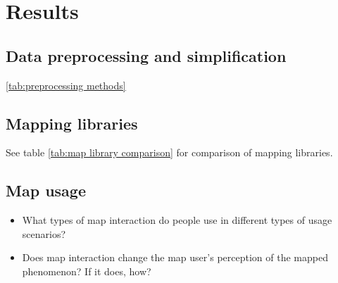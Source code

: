 \section{Results}

\subsection{Data preprocessing and simplification}

\ref{tab:preprocessing methods}



\subsection{Mapping libraries}


See table \ref{tab:map library comparison} for comparison of mapping libraries.


\subsection{Map usage}

\begin{itemize}
	\item What types of map interaction do people use
	in different types of usage scenarios?
	\item Does map interaction change
	the map user's perception of the mapped phenomenon? If it does, how?
\end{itemize}

